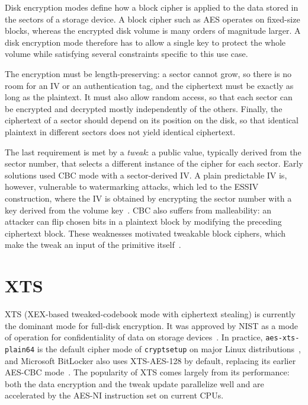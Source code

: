 \documentclass[
  digital,     %
  oneside,     %
  nosansbold,  %
  nocolorbold, %
  lof,         %
  lot,         %
]{fithesis4}
\begin{document}
Disk encryption modes define how a block cipher is applied to the data stored in the sectors of a storage device. A block cipher such as AES operates on fixed-size blocks, whereas the encrypted disk volume is many orders of magnitude larger.
A disk encryption mode therefore has to allow a single key to protect the whole volume while satisfying several constraints specific to this use case. 

The encryption must be length-preserving: a sector cannot grow, so there is no room for an IV or an authentication tag, and the ciphertext must be exactly as long as the plaintext. It must also allow random access, so that each sector can be encrypted and decrypted mostly independently of the others. Finally, the ciphertext of a sector should depend on its position on the disk, so that identical plaintext in different sectors does not yield identical ciphertext.

The last requirement is met by a \emph{tweak}: a public value, typically derived from the sector number, that selects a different instance of the cipher for each sector. Early solutions used CBC mode with a sector-derived IV. A plain predictable IV is, however, vulnerable to watermarking attacks, which led to the ESSIV construction, where the IV is obtained by encrypting the sector number with a key derived from the volume key~\cite{fruhwirth_new_2005}. CBC also suffers from malleability: an attacker can flip chosen bits in a plaintext block by modifying the preceding ciphertext block. These weaknesses motivated tweakable block ciphers, which make the tweak an input of the primitive itself~\cite{liskov_tweakable_2002}.

\section{XTS}
\label{sec:xts}

XTS (XEX-based tweaked-codebook mode with ciphertext stealing) is currently the dominant mode for full-disk encryption. It was approved by NIST as a mode of operation for confidentiality of data on storage devices~\cite{dworkin_recommendation_2010}. 
In practice, \texttt{aes-xts-plain64} is the default cipher mode of \texttt{cryptsetup} on major Linux distributions~\cite{noauthor_frequentlyaskedquestions_nodate}, and Microsoft BitLocker also uses XTS-AES-128 by default, replacing its earlier AES-CBC mode~\cite{officedocspr5_bitlocker_nodate}. 
The popularity of XTS comes largely from its performance: both the data encryption and the tweak update parallelize well and are accelerated by the AES-NI instruction set on current CPUs.
\end{document}
